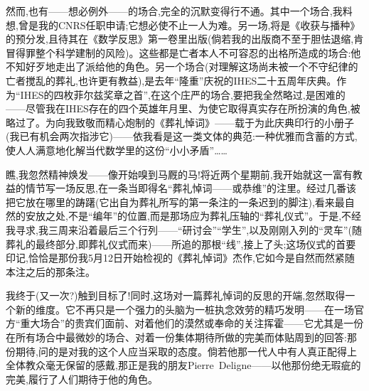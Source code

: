 然而,也有——想必例外——的场合,完全的沉默变得行不通。其中一个场合,我料想,曾是我的CNRS任职申请;它想必使不止一人为难。另一场,将是《收获与播种》的预分发,且待其在《数学反思》第一卷里出版(倘若我的出版商不至于胆怯退缩,肯冒得罪整个科学建制的风险)。这些都是亡者本人不可容忍的出格所造成的场合:他不知好歹地走出了派给他的角色。另一个场合(对理解这场尚未被一个不守纪律的亡者搅乱的葬礼,也许更有教益),是去年“隆重”庆祝的IHES二十五周年庆典。作为“IHES的四枚菲尔兹奖章之首”,在这个庄严的场合,要把我全然略过,是困难的——尽管我在IHES存在的四个英雄年月里、为使它取得真实存在所扮演的角色,被略过了。为向我致敬而精心炮制的《葬礼悼词》——载于为此庆典印行的小册子(我已有机会两次指涉它)——依我看是这一类文体的典范:一种优雅而含蓄的方式,使人人满意地化解当代数学里的这份“小小矛盾”……

瞧,我忽然精神焕发——像开始嗅到马厩的马!将近两个星期前,我开始就这一富有教益的情节写一场反思,在一条当即得名“葬礼悼词——或恭维”的注里。经过几番该把它放在哪里的踌躇(它出自为葬礼所写的第一条注的一条迟到的脚注),看来最自然的安放之处,不是“编年”的位置,而是那场应为葬礼压轴的“葬礼仪式”。于是,不经我寻求,我三周来沿着最后三个行列——“研讨会”“学生”,以及刚刚入列的“灵车”(随葬礼的最终部分,即葬礼仪式而来)——所追的那根“线”,接上了头;这场仪式的首要印记,恰恰是那份我5月12日开始检视的《葬礼悼词》杰作\dmark{},它如今是自然而然紧随本注之后的那条注。

我终于(又一次?)触到目标了!同时,这场对一篇葬礼悼词的反思的开端,忽然取得一个新的维度。它不再只是一个强力的头脑为一桩执念效劳的精巧发明——在一场官方“重大场合”的贵宾们面前、对着他们的漠然或奉命的关注挥霍——它尤其是一份在所有场合中最微妙的场合、对着一份集体期待所做的完美而体贴周到的回答:那份期待,问的是对我的这个人应当采取的态度。倘若他那一代人中有人真正配得上全体教众毫无保留的感戴,那正是我的朋友Pierre~Deligne——以他那份绝无瑕疵的完美,履行了人们期待于他的角色。
